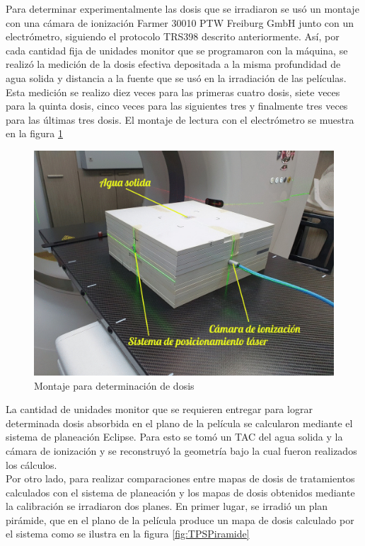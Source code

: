 Para determinar experimentalmente las dosis que se irradiaron se usó un montaje con una cámara de ionización Farmer 30010 PTW Freiburg GmbH junto con un electrómetro, siguiendo el protocolo TRS398 descrito anteriormente. Así, por cada cantidad fija de unidades monitor que se programaron con la máquina, se realizó la medición de la dosis efectiva depositada a la misma profundidad de agua solida y distancia a la fuente que se usó en la irradiación de las películas. Esta medición se realizo diez veces para las primeras cuatro dosis, siete veces para la quinta dosis, cinco veces para las siguientes tres y finalmente tres veces para las últimas tres dosis. El montaje de lectura con el electrómetro se muestra en la figura \ref{fig:Montajeelectrometro}\\
\begin{figure}[H]
	\centering
	\includegraphics[width=0.7\linewidth]{images/elctrometro.jpg}
	
	\caption{Montaje para determinación de dosis}
	\label{fig:Montajeelectrometro}
\end{figure}

La cantidad de unidades monitor que se requieren entregar para lograr determinada dosis absorbida en el plano de la película se calcularon mediante el sistema de planeación Eclipse. Para esto se tomó un TAC del agua solida y la cámara de ionización y se reconstruyó la geometría bajo la cual fueron realizados los cálculos.\\

Por otro lado, para realizar comparaciones entre mapas de dosis de tratamientos calculados con el sistema de planeación y los mapas de dosis obtenidos mediante la calibración  se irradiaron dos planes. En primer lugar, se irradió un plan pirámide, que en el plano de la película produce un mapa de dosis calculado por el sistema como se ilustra en la figura \ref{fig:TPSPiramide}\\

